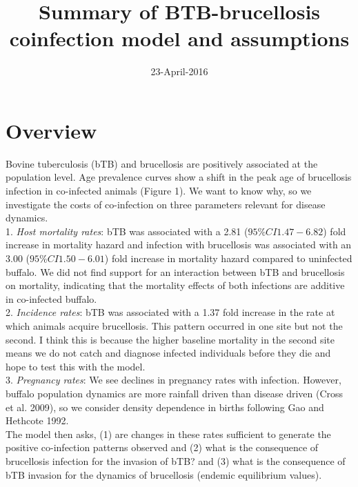 \documentclass[letterpaper,12pt]{article}
\begin{document}
\linenumbers

\title{Summary of BTB-brucellosis coinfection model and assumptions}
\date{23-April-2016}

\maketitle
\doublespacing

\section*{Overview}
Bovine tuberculosis (bTB) and brucellosis are positively associated at the population level.   Age prevalence curves show a shift in the peak age of brucellosis infection in co-infected animals (Figure 1).  We want to know why, so we investigate the costs of co-infection on three parameters relevant for disease dynamics. \\
1. \textit{Host mortality rates}: bTB was associated with a 2.81 ($95\% CI 1.47-6.82$) fold increase in mortality hazard and infection with brucellosis was associated with an 3.00 ($95\% CI 1.50-6.01$) fold increase in mortality hazard compared to uninfected buffalo.  We did not find support for an interaction between bTB and brucellosis on mortality, indicating that the mortality effects of both infections are additive in co-infected buffalo.   \\
2. \textit{Incidence rates}:  bTB was associated with a 1.37 fold increase in the rate at which animals acquire brucellosis.  This pattern occurred in one site but not the second.  I think this is because the higher baseline mortality in the second site means we do not catch and diagnose infected individuals before they die and hope to test this with the model.\\
3. \textit{Pregnancy rates}:  We see declines in pregnancy rates with infection.  However, buffalo population dynamics are more rainfall driven than disease driven (Cross et al. 2009), so we consider density dependence in births following Gao and Hethcote 1992.\\

The model then asks, (1) are changes in these rates sufficient to generate the positive co-infection patterns observed and (2) what is the consequence of brucellosis infection for the invasion of bTB? and (3) what is the consequence of bTB invasion for the dynamics of brucellosis (endemic equilibrium values). 
\end{document}
